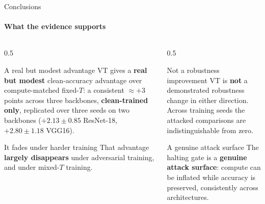 \documentclass[aspectratio=169,11pt]{beamer}
\begin{document}
\begin{frame}{Conclusions}\framesubtitle{What the evidence supports}
\footnotesize
\begin{columns}[T]
\begin{column}{0.5\textwidth}
\begin{block}{A real but modest advantage}
VT gives a \textbf{real but modest} clean-accuracy advantage over compute-matched
fixed-$T$: a consistent $\approx +3$ points across three backbones, \textbf{clean-trained
only}, replicated over three seeds on two backbones ($+2.13 \pm 0.85$ ResNet-18,
$+2.80 \pm 1.18$ VGG16).
\end{block}
\vspace{0.3em}
\begin{block}{It fades under harder training}
That advantage \textbf{largely disappears} under adversarial training, and under
mixed-$T$ training.
\end{block}
\end{column}
\begin{column}{0.5\textwidth}
\begin{block}{Not a robustness improvement}
VT is \textbf{not} a demonstrated robustness change in either direction. Across
training seeds the attacked comparisons are indistinguishable from zero.
\end{block}
\vspace{0.3em}
\begin{block}{A genuine attack surface}
The halting gate is a \textbf{genuine attack surface}: compute can be inflated while
accuracy is preserved, consistently across architectures.
\end{block}
\end{column}
\end{columns}
\end{frame}
\end{document}
